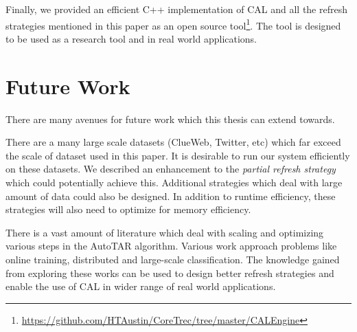 Finally, we provided an efficient C++ implementation of CAL and all the refresh
strategies mentioned in this paper as an open source
tool\footnote{\url{https://github.com/HTAustin/CoreTrec/tree/master/CALEngine}}. The tool is designed
to be used as a research tool and in real world applications.


\section{Future Work}

There are many avenues for future work which this thesis can extend towards.

There are a many large scale datasets (ClueWeb, Twitter, etc) which far exceed
the scale of dataset used in this paper.  It is desirable to run our system
efficiently on these datasets. We described an enhancement to the
\textit{partial refresh strategy} which could potentially achieve this.
Additional strategies which deal with large amount of data could also be
designed. In addition to runtime efficiency, these strategies will also need to
optimize for memory
efficiency.

There is a vast amount of literature which deal with scaling and optimizing
various steps in the AutoTAR algorithm. Various work approach
problems like online training, distributed and large-scale classification. The
knowledge gained from exploring these works can be used to design better refresh
strategies and enable the use of CAL in wider range of real world applications.
